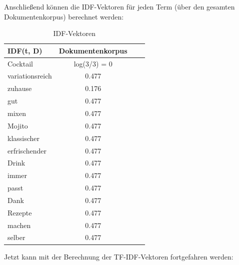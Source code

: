 \noindent
Anschließend können die \ac{IDF}-Vektoren für jeden Term (über den gesamten Dokumentenkorpus) berechnet werden:
\begin{table}[H]
    \centering
    \begin{tabular}{l|c|c|c}
        IDF(t, D)          & Dokumentenkorpus \\
        \hline
        Cocktail            & log(3/3) = 0  \\
        \hline
        variationsreich & 0.477   \\
        \hline
        zuhause                & 0.176  \\
        \hline
        gut                  & 0.477  \\
        \hline
        mixen            & 0.477  \\
        \hline
        Mojito & 0.477  \\
        \hline
        klassischer                & 0.477  \\
        \hline
        erfrischender                  & 0.477  \\
        \hline
        Drink            & 0.477  \\
        \hline
        immer & 0.477  \\
        \hline
        passt                & 0.477  \\
        \hline
        Dank                  & 0.477 \\
        \hline
        Rezepte            & 0.477 \\
        \hline
        machen & 0.477  \\
        \hline
        selber                & 0.477  \\
    \end{tabular}
    \caption{\label{table:IDF_Vektoren}\ac{IDF}-Vektoren}
\end{table}
\noindent
Jetzt kann mit der Berechnung der \ac{TF-IDF}-Vektoren fortgefahren werden:
